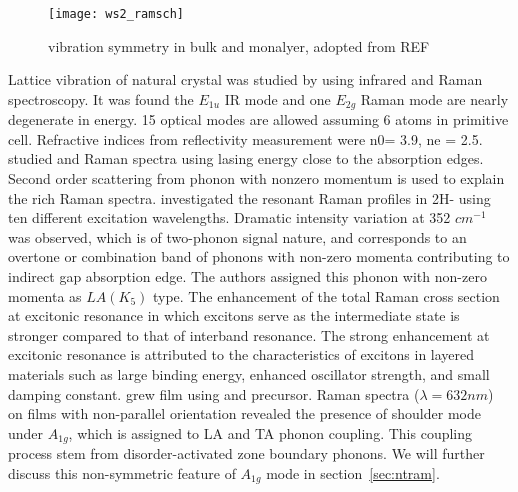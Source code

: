 \begin{figure}[htb]
\centering
\texttt{[image: ws2\_ramsch]}
\caption[ vibration symmetry]{ vibration symmetry in bulk and monalyer, adopted from REF\cite{Ghorbani-asl}}
\label{fig:ws2ramsch}
\end{figure}

Lattice vibration of natural  crystal was studied by \citeauthor{Wieting1971} using infrared and Raman spectroscopy.\cite{Wieting1971} It was found the $E_{1u}$ IR mode and one $E_{2g}$ Raman mode are nearly degenerate in energy. 15 optical modes are allowed assuming 6 atoms in primitive cell. Refractive indices from reflectivity measurement were n0= 3.9, ne = 2.5. \citeauthor{Stacy1985} studied  and  Raman spectra using lasing energy close to the absorption edges.\cite{Stacy1985} Second order scattering from phonon with nonzero momentum is used to explain the rich Raman spectra. \citeauthor{Sourisseau1991} investigated the resonant Raman profiles in 2H- using ten different excitation wavelengths.\cite{Sourisseau1991} Dramatic intensity variation at 352 $cm^{-1}$ was observed, which is of two-phonon signal nature, and corresponds to an overtone or combination band of phonons with non-zero momenta contributing to indirect gap absorption edge. The authors assigned this phonon with non-zero momenta as $LA(K_5)$ type. The enhancement of the total Raman cross section at excitonic resonance in which excitons serve as the intermediate state is stronger compared to that of interband resonance. The strong enhancement at excitonic resonance is attributed to the characteristics of excitons in layered materials such as large binding energy, enhanced oscillator strength, and small damping constant.\cite{Zhao2013} \citeauthor{Chung1998} grew  film using  and  precursor.\cite{Chung1998} Raman spectra ($\lambda=632nm$) on films with non-parallel orientation revealed the presence of shoulder mode under $A_{1g}$, which is assigned to LA and TA phonon coupling. This coupling process stem from disorder-activated zone boundary phonons. We will further discuss this non-symmetric feature of $A_{1g}$ mode in section~\ref{sec:ntram}.

